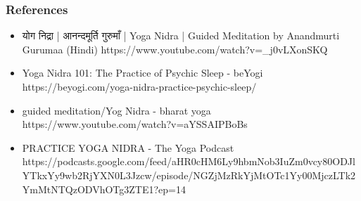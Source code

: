 \begin{frame}[fragile]\frametitle{References}
	\begin{itemize}
	\item योग निद्रा | आनन्दमूर्ति गुरुमाँ | Yoga Nidra | Guided Meditation by Anandmurti Gurumaa (Hindi) https://www.youtube.com/watch?v=\_j0vLXonSKQ
	\item Yoga Nidra 101: The Practice of Psychic Sleep - beYogi https://beyogi.com/yoga-nidra-practice-psychic-sleep/
	\item guided meditation/Yog Nidra - bharat yoga  https://www.youtube.com/watch?v=aYSSAIPBoBs
	\item PRACTICE YOGA NIDRA - The Yoga Podcast https://podcasts.google.com/feed/aHR0cHM6Ly9hbmNob3IuZm0vcy80ODJlYTkxYy9wb2RjYXN0L3Jzcw/episode/NGZjMzRkYjMtOTc1Yy00MjczLTk2YmMtNTQzODVhOTg3ZTE1?ep=14
	\end{itemize}

\end{frame}

